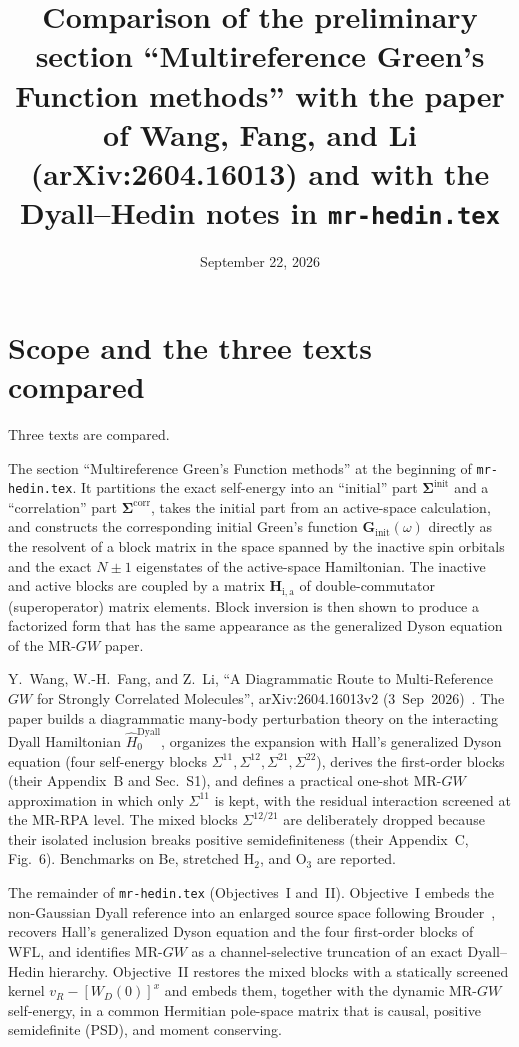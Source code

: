 \documentclass[11pt,a4paper]{article}
\title{Comparison of the preliminary section ``Multireference Green's Function methods''
with the \MRGW{} paper of Wang, Fang, and Li (arXiv:2604.16013) and with the
Dyall--Hedin notes in \texttt{mr-hedin.tex}}
\author{}
\date{September 22, 2026}
\newcommand{\bG}{\boldsymbol{G}}
\newcommand{\bSigma}{\boldsymbol{\Sigma}}
\newcommand{\bH}{\boldsymbol{H}}
\newcommand{\MRGW}{MR-$GW$}
\newcommand{\WFL}{WFL}
\newcommand{\Pre}{Preliminary section}
\newcommand{\DHN}{Dyall--Hedin notes}
\begin{document}
\maketitle

\section{Scope and the three texts compared}

Three texts are compared.

\begin{description}[style=nextline,leftmargin=1.5em]
\item[(A) The \emph{\Pre}.] The section ``Multireference Green's Function
  methods'' at the beginning of \texttt{mr-hedin.tex}.  It partitions the exact
  self-energy into an ``initial'' part $\bSigma^{\text{init}}$ and a
  ``correlation'' part $\bSigma^{\text{corr}}$, takes the initial part from an
  active-space calculation, and constructs the corresponding initial Green's
  function $\bG_{\text{init}}(\omega)$ directly as the resolvent of a block
  matrix in the space spanned by the inactive spin orbitals and the exact
  $N\pm1$ eigenstates of the active-space Hamiltonian.  The inactive and
  active blocks are coupled by a matrix $\bH_{\mathrm{i,a}}$ of double-commutator
  (superoperator) matrix elements.  Block inversion is then shown to produce a
  factorized form that has the same appearance as the generalized Dyson equation
  of the \MRGW{} paper.
\item[(B) \WFL{}.] Y.~Wang, W.-H.~Fang, and Z.~Li, ``A Diagrammatic Route to
  Multi-Reference $GW$ for Strongly Correlated Molecules'', arXiv:2604.16013v2
  (3~Sep~2026)~\cite{WFL2026}.  The paper builds a diagrammatic many-body
  perturbation theory on the interacting Dyall Hamiltonian
  $\hat H_0^{\text{Dyall}}$, organizes the expansion with Hall's generalized
  Dyson equation (four self-energy blocks $\Sigma^{11},\Sigma^{12},\Sigma^{21},\Sigma^{22}$),
  derives the first-order blocks (their Appendix~B and Sec.~S1), and defines a
  practical one-shot \MRGW{} approximation in which only $\Sigma^{11}$ is kept,
  with the residual interaction screened at the MR-RPA level.  The mixed blocks
  $\Sigma^{12/21}$ are deliberately dropped because their isolated inclusion
  breaks positive semidefiniteness (their Appendix~C, Fig.~6).  Benchmarks on
  Be, stretched H$_2$, and O$_3$ are reported.
\item[(C) The \emph{\DHN}.] The remainder of \texttt{mr-hedin.tex} (Objectives~I
  and~II).  Objective~I embeds the non-Gaussian Dyall reference into an enlarged
  source space following Brouder~\cite{Brouder2009}, recovers Hall's
  generalized Dyson equation and the four first-order blocks of \WFL{}, and
  identifies \MRGW{} as a channel-selective truncation of an exact
  Dyall--Hedin hierarchy.  Objective~II restores the mixed blocks with a
  statically screened kernel $v_R-[W_D(0)]^x$ and embeds them, together with
  the dynamic \MRGW{} self-energy, in a common Hermitian pole-space matrix that
  is causal, positive semidefinite (PSD), and moment conserving.
\end{description}
\end{document}
